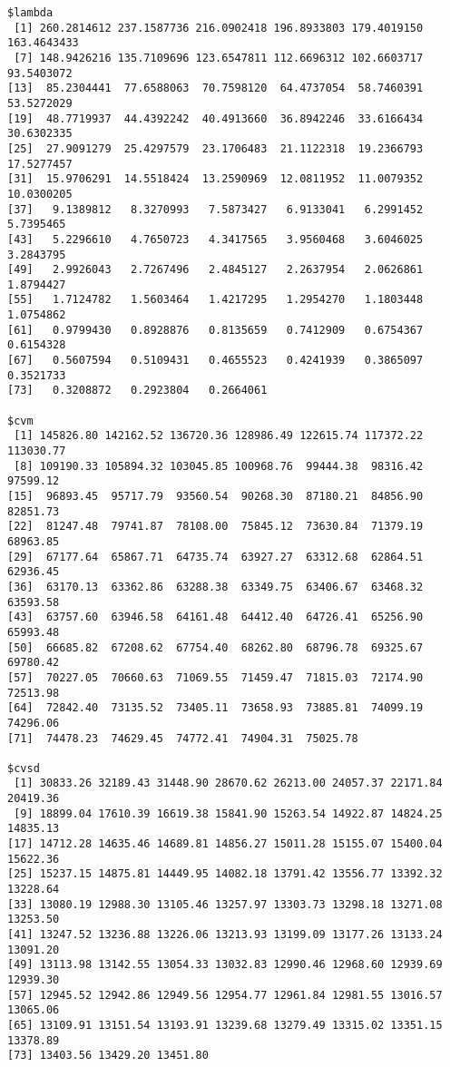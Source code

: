 \documentclass[11pt]{article}
\begin{document}
    
    \begin{verbatim}
$lambda
 [1] 260.2814612 237.1587736 216.0902418 196.8933803 179.4019150 163.4643433
 [7] 148.9426216 135.7109696 123.6547811 112.6696312 102.6603717  93.5403072
[13]  85.2304441  77.6588063  70.7598120  64.4737054  58.7460391  53.5272029
[19]  48.7719937  44.4392242  40.4913660  36.8942246  33.6166434  30.6302335
[25]  27.9091279  25.4297579  23.1706483  21.1122318  19.2366793  17.5277457
[31]  15.9706291  14.5518424  13.2590969  12.0811952  11.0079352  10.0300205
[37]   9.1389812   8.3270993   7.5873427   6.9133041   6.2991452   5.7395465
[43]   5.2296610   4.7650723   4.3417565   3.9560468   3.6046025   3.2843795
[49]   2.9926043   2.7267496   2.4845127   2.2637954   2.0626861   1.8794427
[55]   1.7124782   1.5603464   1.4217295   1.2954270   1.1803448   1.0754862
[61]   0.9799430   0.8928876   0.8135659   0.7412909   0.6754367   0.6154328
[67]   0.5607594   0.5109431   0.4655523   0.4241939   0.3865097   0.3521733
[73]   0.3208872   0.2923804   0.2664061

$cvm
 [1] 145826.80 142162.52 136720.36 128986.49 122615.74 117372.22 113030.77
 [8] 109190.33 105894.32 103045.85 100968.76  99444.38  98316.42  97599.12
[15]  96893.45  95717.79  93560.54  90268.30  87180.21  84856.90  82851.73
[22]  81247.48  79741.87  78108.00  75845.12  73630.84  71379.19  68963.85
[29]  67177.64  65867.71  64735.74  63927.27  63312.68  62864.51  62936.45
[36]  63170.13  63362.86  63288.38  63349.75  63406.67  63468.32  63593.58
[43]  63757.60  63946.58  64161.48  64412.40  64726.41  65256.90  65993.48
[50]  66685.82  67208.62  67754.40  68262.80  68796.78  69325.67  69780.42
[57]  70227.05  70660.63  71069.55  71459.47  71815.03  72174.90  72513.98
[64]  72842.40  73135.52  73405.11  73658.93  73885.81  74099.19  74296.06
[71]  74478.23  74629.45  74772.41  74904.31  75025.78

$cvsd
 [1] 30833.26 32189.43 31448.90 28670.62 26213.00 24057.37 22171.84 20419.36
 [9] 18899.04 17610.39 16619.38 15841.90 15263.54 14922.87 14824.25 14835.13
[17] 14712.28 14635.46 14689.81 14856.27 15011.28 15155.07 15400.04 15622.36
[25] 15237.15 14875.81 14449.95 14082.18 13791.42 13556.77 13392.32 13228.64
[33] 13080.19 12988.30 13105.46 13257.97 13303.73 13298.18 13271.08 13253.50
[41] 13247.52 13236.88 13226.06 13213.93 13199.09 13177.26 13133.24 13091.20
[49] 13113.98 13142.55 13054.33 13032.83 12990.46 12968.60 12939.69 12939.30
[57] 12945.52 12942.86 12949.56 12954.77 12961.84 12981.55 13016.57 13065.06
[65] 13109.91 13151.54 13193.91 13239.68 13279.49 13315.02 13351.15 13378.89
[73] 13403.56 13429.20 13451.80


\end{verbatim}
\end{document}

